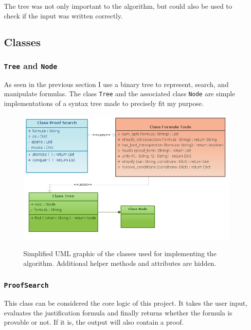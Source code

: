 The tree was not only important to the algorithm, but could also be used to check if the input was written correctly.

\subsection{Classes}

\subsubsection[Tree and Node]{\texttt{Tree} and \texttt{Node}}
As seen in the previous section I use a binary tree to represent, search, and manipulate formulas. The class \texttt{Tree} and the associated class \texttt{Node} are simple implementations of a syntax tree made to precisely fit my purpose. 

\begin{figure}[H]
	\includegraphics[width=1\textwidth]{Figures/uml_j-logic.png}
	\label{uml}
	\caption{Simplified UML graphic of the classes used for implementing the algorithm. Additional helper methods and attributes are hidden.}
\end{figure}


\subsubsection[ProofSearch]{\texttt{ProofSearch}}
This class can be considered the core logic of this project. It takes the user input, evaluates the justification formula and finally returns whether the formula is provable or not. If it is, the output will also contain a proof.

